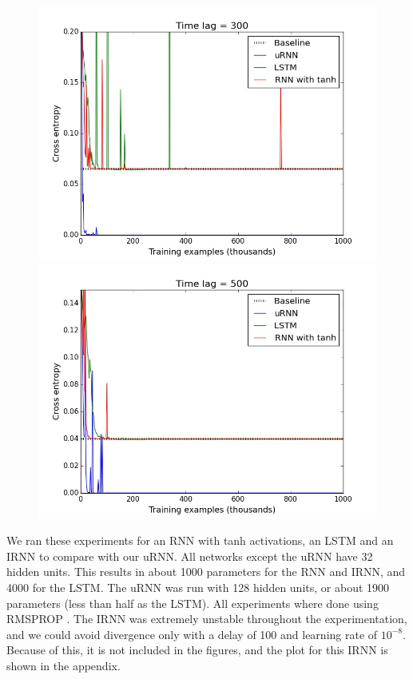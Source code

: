 \documentclass{article} %
\begin{document}
\begin{figure}[ht]
\begin{minipage}[b]{0.5\linewidth}
    \includegraphics[scale=0.25]{figures/memory_300.jpeg}
    \vspace{4ex}
    \end{minipage}%
  \begin{minipage}[b]{0.5\linewidth}
    \centering
    \includegraphics[scale=0.25]{figures/memory_500.jpeg}
    \vspace{4ex}
  \end{minipage} 
\end{figure}

We ran these experiments for an RNN with tanh activations, an LSTM and an IRNN to compare with our uRNN. All networks except the uRNN have 32 hidden units. This results in about 1000 parameters for the RNN and IRNN, and 4000 for the LSTM. The uRNN was run with 128 hidden units, or about 1900 parameters (less than half as the LSTM). All experiments where done using RMSPROP \citep{RMSPROP}. The IRNN was extremely unstable throughout the experimentation, and we could avoid divergence only with a delay of 100 and learning rate of $10^{-8}$. Because of this, it is not included in the figures, and the plot for this IRNN is shown in the appendix.
\end{document}
